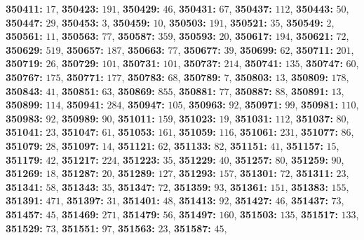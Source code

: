 \textsf{\bfseries 350411:} $17$, \textsf{\bfseries 350423:} $191$, \textsf{\bfseries 350429:} $46$, \textsf{\bfseries 350431:} $67$, \textsf{\bfseries 350437:} $112$, \textsf{\bfseries 350443:} $50$, \textsf{\bfseries 350447:} $29$, \textsf{\bfseries 350453:} $3$, \textsf{\bfseries 350459:} $10$, \textsf{\bfseries 350503:} $191$, \textsf{\bfseries 350521:} $35$, \textsf{\bfseries 350549:} $2$, \textsf{\bfseries 350561:} $11$, \textsf{\bfseries 350563:} $77$, \textsf{\bfseries 350587:} $359$, \textsf{\bfseries 350593:} $20$, \textsf{\bfseries 350617:} $194$, \textsf{\bfseries 350621:} $72$, \textsf{\bfseries 350629:} $519$, \textsf{\bfseries 350657:} $187$, \textsf{\bfseries 350663:} $77$, \textsf{\bfseries 350677:} $39$, \textsf{\bfseries 350699:} $62$, \textsf{\bfseries 350711:} $201$, \textsf{\bfseries 350719:} $26$, \textsf{\bfseries 350729:} $101$, \textsf{\bfseries 350731:} $101$, \textsf{\bfseries 350737:} $214$, \textsf{\bfseries 350741:} $135$, \textsf{\bfseries 350747:} $60$, \textsf{\bfseries 350767:} $175$, \textsf{\bfseries 350771:} $177$, \textsf{\bfseries 350783:} $68$, \textsf{\bfseries 350789:} $7$, \textsf{\bfseries 350803:} $13$, \textsf{\bfseries 350809:} $178$, \textsf{\bfseries 350843:} $41$, \textsf{\bfseries 350851:} $63$, \textsf{\bfseries 350869:} $855$, \textsf{\bfseries 350881:} $77$, \textsf{\bfseries 350887:} $88$, \textsf{\bfseries 350891:} $13$, \textsf{\bfseries 350899:} $114$, \textsf{\bfseries 350941:} $284$, \textsf{\bfseries 350947:} $105$, \textsf{\bfseries 350963:} $92$, \textsf{\bfseries 350971:} $99$, \textsf{\bfseries 350981:} $110$, \textsf{\bfseries 350983:} $92$, \textsf{\bfseries 350989:} $90$, \textsf{\bfseries 351011:} $159$, \textsf{\bfseries 351023:} $19$, \textsf{\bfseries 351031:} $112$, \textsf{\bfseries 351037:} $80$, \textsf{\bfseries 351041:} $23$, \textsf{\bfseries 351047:} $61$, \textsf{\bfseries 351053:} $161$, \textsf{\bfseries 351059:} $116$, \textsf{\bfseries 351061:} $231$, \textsf{\bfseries 351077:} $86$, \textsf{\bfseries 351079:} $28$, \textsf{\bfseries 351097:} $14$, \textsf{\bfseries 351121:} $62$, \textsf{\bfseries 351133:} $82$, \textsf{\bfseries 351151:} $41$, \textsf{\bfseries 351157:} $15$, \textsf{\bfseries 351179:} $42$, \textsf{\bfseries 351217:} $224$, \textsf{\bfseries 351223:} $35$, \textsf{\bfseries 351229:} $40$, \textsf{\bfseries 351257:} $80$, \textsf{\bfseries 351259:} $90$, \textsf{\bfseries 351269:} $18$, \textsf{\bfseries 351287:} $20$, \textsf{\bfseries 351289:} $127$, \textsf{\bfseries 351293:} $157$, \textsf{\bfseries 351301:} $72$, \textsf{\bfseries 351311:} $23$, \textsf{\bfseries 351341:} $58$, \textsf{\bfseries 351343:} $35$, \textsf{\bfseries 351347:} $72$, \textsf{\bfseries 351359:} $93$, \textsf{\bfseries 351361:} $151$, \textsf{\bfseries 351383:} $155$, \textsf{\bfseries 351391:} $471$, \textsf{\bfseries 351397:} $31$, \textsf{\bfseries 351401:} $48$, \textsf{\bfseries 351413:} $92$, \textsf{\bfseries 351427:} $46$, \textsf{\bfseries 351437:} $73$, \textsf{\bfseries 351457:} $45$, \textsf{\bfseries 351469:} $271$, \textsf{\bfseries 351479:} $56$, \textsf{\bfseries 351497:} $160$, \textsf{\bfseries 351503:} $135$, \textsf{\bfseries 351517:} $133$, \textsf{\bfseries 351529:} $73$, \textsf{\bfseries 351551:} $97$, \textsf{\bfseries 351563:} $23$, \textsf{\bfseries 351587:} $45$, 
